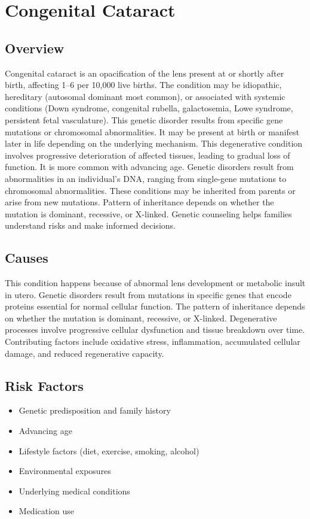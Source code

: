 \chapter{Congenital Cataract}
\label{sec:Congenital Cataract}

\section{Overview}
Congenital cataract is an opacification of the lens present at or shortly after birth, affecting 1--6 per 10,000 live births. The condition may be idiopathic, hereditary (autosomal dominant most common), or associated with systemic conditions (Down syndrome, congenital rubella, galactosemia, Lowe syndrome, persistent fetal vasculature). This genetic disorder results from specific gene mutations or chromosomal abnormalities. It may be present at birth or manifest later in life depending on the underlying mechanism. This degenerative condition involves progressive deterioration of affected tissues, leading to gradual loss of function. It is more common with advancing age. Genetic disorders result from abnormalities in an individual's DNA, ranging from single-gene mutations to chromosomal abnormalities. These conditions may be inherited from parents or arise from new mutations. Pattern of inheritance depends on whether the mutation is dominant, recessive, or X-linked. Genetic counseling helps families understand risks and make informed decisions.
\section{Causes}
This condition happens because of abnormal lens development or metabolic insult in utero. Genetic disorders result from mutations in specific genes that encode proteins essential for normal cellular function. The pattern of inheritance depends on whether the mutation is dominant, recessive, or X-linked. Degenerative processes involve progressive cellular dysfunction and tissue breakdown over time. Contributing factors include oxidative stress, inflammation, accumulated cellular damage, and reduced regenerative capacity.   
\section{Risk Factors}

\begin{itemize}[noitemsep]
  \item Genetic predisposition and family history
  \item Advancing age
  \item Lifestyle factors (diet, exercise, smoking, alcohol)
  \item Environmental exposures
  \item Underlying medical conditions
  \item Medication use
\end{itemize}
